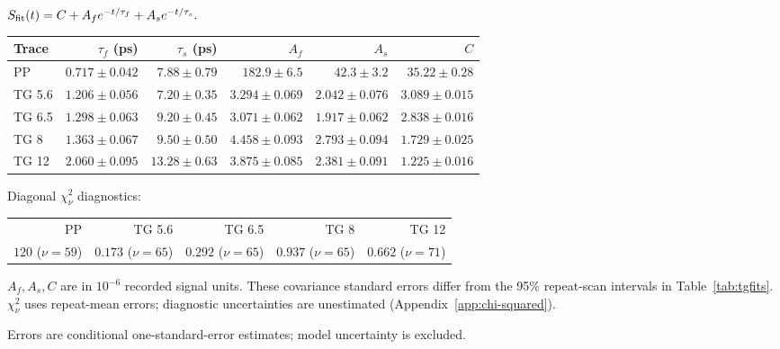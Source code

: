 \par\smallskip\begingroup\small
\setlength{\tabcolsep}{5pt}
\(S_{\rm fit}(t)=C+A_f e^{-t/\tau_f}+A_s e^{-t/\tau_s}.\)
\par\smallskip\begin{tabular}{lrrrrr}\toprule
Trace & $\tau_f$ (ps) & $\tau_s$ (ps) & $A_f$ & $A_s$ & $C$\\\midrule
PP & $0.717\pm0.042$ & $7.88\pm0.79$ & $182.9\pm6.5$ & $42.3\pm3.2$ & $35.22\pm0.28$\\
TG 5.6 & $1.206\pm0.056$ & $7.20\pm0.35$ & $3.294\pm0.069$ & $2.042\pm0.076$ & $3.089\pm0.015$\\
TG 6.5 & $1.298\pm0.063$ & $9.20\pm0.45$ & $3.071\pm0.062$ & $1.917\pm0.062$ & $2.838\pm0.016$\\
TG 8 & $1.363\pm0.067$ & $9.50\pm0.50$ & $4.458\pm0.093$ & $2.793\pm0.094$ & $1.729\pm0.025$\\
TG 12 & $2.060\pm0.095$ & $13.28\pm0.63$ & $3.875\pm0.085$ & $2.381\pm0.091$ & $1.225\pm0.016$\\
\bottomrule\end{tabular}
\par\smallskip Diagonal $\chi^2_\nu$ diagnostics:\par\begin{tabular}{rrrrr}PP & TG 5.6 & TG 6.5 & TG 8 & TG 12\\$120$ ($\nu=59$) & $0.173$ ($\nu=65$) & $0.292$ ($\nu=65$) & $0.937$ ($\nu=65$) & $0.662$ ($\nu=71$)\\\end{tabular}\par\smallskip\noindent $A_f,A_s,C$ are in $10^{-6}$ recorded signal units. These covariance standard errors differ from the 95\% repeat-scan intervals in Table~\ref{tab:tgfits}. $\chi^2_\nu$ uses repeat-mean errors; diagnostic uncertainties are unestimated (Appendix~\ref{app:chi-squared}).
\par\smallskip\noindent Errors are conditional one-standard-error estimates; model uncertainty is excluded.
\par\endgroup
